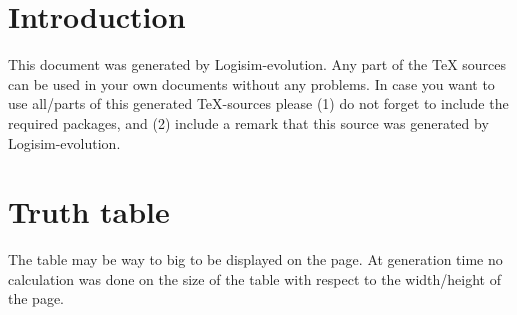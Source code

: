 \documentclass [15pt,a4paper,twoside]{article}
\begin{document}
\section{Introduction}
This document was generated by Logisim-evolution. Any part of the TeX sources can be used in your own documents without any problems. In case you want to use all/parts of this generated TeX-sources please (1) do not forget to include the required packages, and (2) include a remark that this source was generated by Logisim-evolution.
\section{Truth table}
The table may be way to big to be displayed on the page. At generation time no calculation was done on the size of the table with respect to the width/height of the page.
\end{document}
